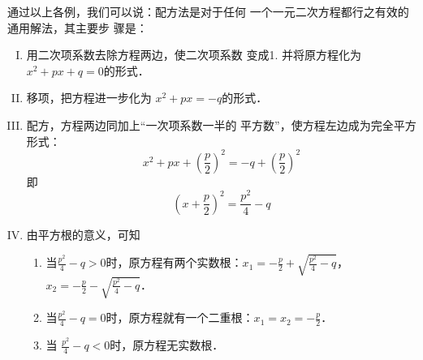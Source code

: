 通过以上各例，我们可以说：配方法是对于任何
一个一元二次方程都行之有效的通用解法，其主要步
骤是：
\begin{blk}{}
\begin{enumerate}[I. ]
    \item 用二次项系数去除方程两边，使二次项系数
    变成1. 并将原方程化为$x^2+px+q=0$的形式．
    \item 移项，把方程进一步化为
    $x^2+px=-q$的形式．
    \item 配方，方程两边同加上“一次项系数一半的
    平方数”，使方程左边成为完全平方形式：
    \[x^2+px+\left(\frac{p}{2}\right)^2=-q+\left(\frac{p}{2}\right)^2\]
    即
    \[\left(x+\frac{p}{2}\right)^2=\frac{p^2}{4}-q\]
    \item 由平方根的意义，可知
\begin{enumerate}[1.]
    \item 当$\frac{p^2}{4}-q>0$时，原方程有两个实数根：$x_1=-\frac{p}{2}+\sqrt{\frac{p^2}{4}-q}$，$x_2=-\frac{p}{2}-\sqrt{\frac{p^2}{4}-q}$．
    \item 当$\frac{p^2}{4}-q=0$时，原方程就有一个二重根：$x_1=x_2=-\frac{p}{2}$．
    \item 当
    $\frac{p^2}{4}-q<0$时，原方程无实数根．
\end{enumerate}
\end{enumerate}
\end{blk}

